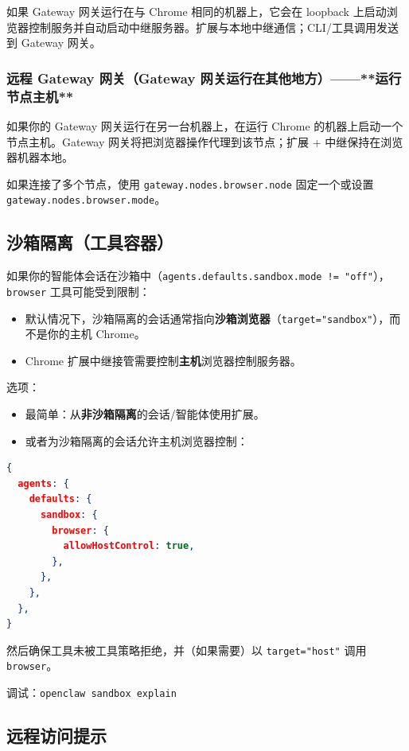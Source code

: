 如果 Gateway 网关运行在与 Chrome 相同的机器上，它会在 loopback 上启动浏览器控制服务并自动启动中继服务器。扩展与本地中继通信；CLI/工具调用发送到 Gateway 网关。

\subsubsection{远程 Gateway 网关（Gateway 网关运行在其他地方）——**运行节点主机**}


如果你的 Gateway 网关运行在另一台机器上，在运行 Chrome 的机器上启动一个节点主机。Gateway 网关将把浏览器操作代理到该节点；扩展 + 中继保持在浏览器机器本地。

如果连接了多个节点，使用 \texttt{gateway.nodes.browser.node} 固定一个或设置 \texttt{gateway.nodes.browser.mode}。

\subsection{沙箱隔离（工具容器）}


如果你的智能体会话在沙箱中（\texttt{agents.defaults.sandbox.mode != "off"}），\texttt{browser} 工具可能受到限制：

\begin{itemize}
  \item 默认情况下，沙箱隔离的会话通常指向\textbf{沙箱浏览器}（\texttt{target="sandbox"}），而不是你的主机 Chrome。
  \item Chrome 扩展中继接管需要控制\textbf{主机}浏览器控制服务器。
\end{itemize}


选项：

\begin{itemize}
  \item 最简单：从\textbf{非沙箱隔离}的会话/智能体使用扩展。
  \item 或者为沙箱隔离的会话允许主机浏览器控制：
\end{itemize}


\begin{lstlisting}[language=json]
{
  agents: {
    defaults: {
      sandbox: {
        browser: {
          allowHostControl: true,
        },
      },
    },
  },
}
\end{lstlisting}


然后确保工具未被工具策略拒绝，并（如果需要）以 \texttt{target="host"} 调用 \texttt{browser}。

调试：\texttt{openclaw sandbox explain}

\subsection{远程访问提示}


